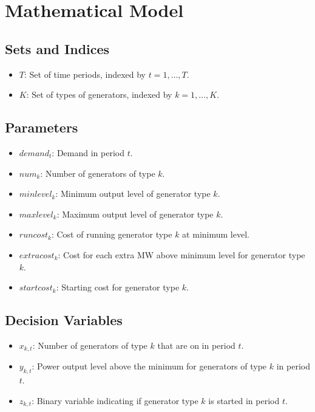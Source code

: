 \documentclass{article}
\begin{document}
\section*{Mathematical Model}

\subsection*{Sets and Indices}
\begin{itemize}
    \item $T$: Set of time periods, indexed by $t = 1,\ldots,T$.
    \item $K$: Set of types of generators, indexed by $k = 1,\ldots,K$.
\end{itemize}

\subsection*{Parameters}
\begin{itemize}
    \item $demand_t$: Demand in period $t$.
    \item $num_k$: Number of generators of type $k$.
    \item $minlevel_k$: Minimum output level of generator type $k$.
    \item $maxlevel_k$: Maximum output level of generator type $k$.
    \item $runcost_k$: Cost of running generator type $k$ at minimum level.
    \item $extracost_k$: Cost for each extra MW above minimum level for generator type $k$.
    \item $startcost_k$: Starting cost for generator type $k$.
\end{itemize}

\subsection*{Decision Variables}
\begin{itemize}
    \item $x_{k,t}$: Number of generators of type $k$ that are on in period $t$.
    \item $y_{k,t}$: Power output level above the minimum for generators of type $k$ in period $t$.
    \item $z_{k,t}$: Binary variable indicating if generator type $k$ is started in period $t$.
\end{itemize}
\end{document}
